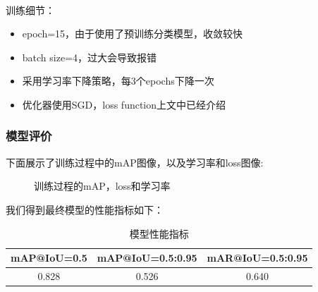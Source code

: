 \documentclass[UTF8]{ctexart}
\begin{document}
~\\

训练细节：
\begin{itemize}
    \item epoch=15，由于使用了预训练分类模型，收敛较快
    \item batch size=4，过大会导致报错
    \item 采用学习率下降策略，每3个epochs下降一次
    \item 优化器使用SGD，loss function上文中已经介绍
\end{itemize}


\subsubsection{模型评价}

下面展示了训练过程中的mAP图像，以及学习率和loss图像:
\begin{figure}[H]
    \centering
    \hspace{0.5in}
    \hspace{0.5in}
    \caption{训练过程的mAP，loss和学习率}
\end{figure}

我们得到最终模型的性能指标如下：

\begin{table}[H]
    \begin{center}
        \begin{tabular}{ccc}
            \hline
            mAP@IoU=0.5  & mAP@IoU=0.5:0.95 & mAR@IoU=0.5:0.95 \\ \hline
            0.828 & 0.526 & 0.640 \\ \hline
            \end{tabular}
        \caption{模型性能指标}
    \end{center}
\end{table}
\end{document}
